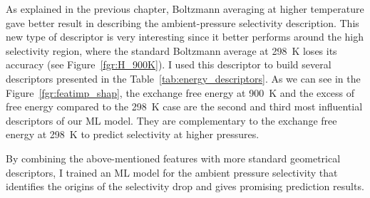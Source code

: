 \documentclass[main]{subfiles}
\begin{document}
As explained in the previous chapter, Boltzmann averaging at higher temperature gave better result in describing the ambient-pressure selectivity description. 
This new type of descriptor is very interesting since it better performs around the high selectivity region, where the standard Boltzmann average at \SI{298}{\kelvin} loses its accuracy (see Figure~\ref{fgr:H_900K}). I used this descriptor to build several descriptors presented in the Table~\ref{tab:energy_descriptors}. As we can see in the Figure~\ref{fgr:featimp_shap}, the exchange free energy at \SI{900}{\kelvin} and the excess of free energy compared to the \SI{298}{\kelvin} case are the second and third most influential descriptors of our ML model. They are complementary to the exchange free energy at \SI{298}{\kelvin} to predict selectivity at higher pressures.

By combining the above-mentioned features with more standard geometrical descriptors, I trained an ML model for the ambient pressure selectivity that identifies the origins of the selectivity drop and gives promising prediction results.

\clearpage
\end{document}
